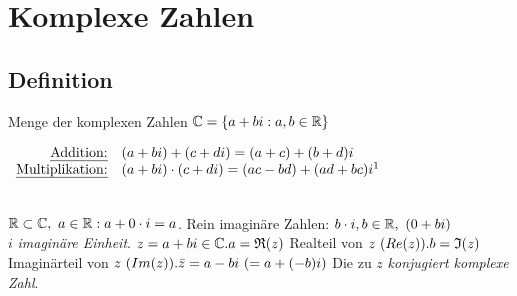 

\resetHeadWidth
\tableofcontents
\listoffigures
\clearpage
\section{Komplexe Zahlen}
\renewcommand{\uline}[1]{\emph{#1}}
\renewcommand{\underline}[1]{\emph{#1}}
\renewcommand{\footnoterule}{}
\subsection{Definition}
Menge der komplexen Zahlen $\mathbb{C} =\{a+bi : a,b \in \mathbb{R}\}$
\begin{table*}[h!]
\centering
$\begin{array}{rl}
\text{\quad\uline{Addition:}}& (a+bi) + (c+di) = (a+c)+(b+d)i\\
\text{\uline{Multiplikation:}}& (a+bi) \cd  (c+di) = (ac -bd) + (ad+bc)i\footnotemark
\end{array}$\end{table*}
\\
$\mathbb{R} \subset \mathbb{C} ,\ a \in \mathbb{R} : a + 0 \cdot i = a$.
Rein imagin\"are Zahlen: $b \cdot i , b \in \mathbb{R},\ (0 + bi)$\\
$i$ \underline{imagin\"are Einheit}.
$z = a+bi \in \mathbb{C}.\\
a = \mathfrak{R}(z)$ Realteil von $z\ (Re(z)).\\
b = \mathfrak{I}(z)$ Imagin\"arteil von $z\ (Im(z)).\\
\bar{z} = a - bi\ (= a + (-b)i)$ Die zu $z$ \uline{konjugiert komplexe Zahl}.
